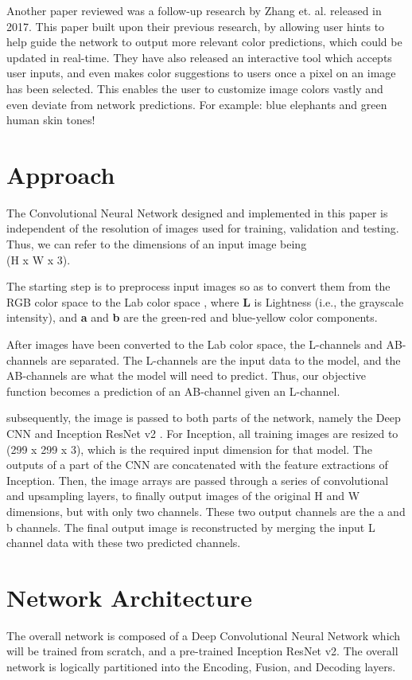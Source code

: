 \documentclass[10pt,twocolumn,letterpaper]{article}
\begin{document}
Another paper reviewed was a follow-up research by Zhang et. al. \cite{Zhang2} released in 2017. This paper built upon their previous research, by allowing user hints to help guide the network to output more relevant color predictions, which could be updated in real-time. They have also released an interactive tool which accepts user inputs, and even makes color suggestions to users once a pixel on an image has been selected. This enables the user to customize image colors vastly and even deviate from network predictions. For example: blue elephants and green human skin tones!

\section{Approach}
The Convolutional Neural Network designed and implemented in this paper is independent of the resolution of images used for training, validation and testing. Thus, we can refer to the dimensions of an input image being\\
(H x W x 3).

The starting step is to preprocess input images so as to convert them from the RGB color space to the Lab color space \cite{LabColorSpace}, where \textbf{L} is Lightness (i.e., the grayscale intensity), and \textbf{a} and \textbf{b} are the green-red and blue-yellow color components.

After images have been converted to the Lab color space, the L-channels and AB-channels are separated. The L-channels are the input data to the model, and the AB-channels are what the model will need to predict. Thus, our objective function becomes a prediction of an AB-channel given an L-channel.

subsequently, the image is passed to both parts of the network, namely the Deep CNN and Inception ResNet v2 \cite{Inception}. For Inception, all training images are resized to\\(299 x 299 x 3), which is the required input dimension for that model. The outputs of a part of the CNN are concatenated with the feature extractions of Inception. Then, the image arrays are passed through a series of convolutional and upsampling layers, to finally output images of the original H and W dimensions, but with only two channels. These two output channels are the a and b channels. The final output image is reconstructed by merging the input L channel data with these two predicted channels.

\section{Network Architecture}
The overall  network is composed of a Deep Convolutional Neural Network which will be trained from scratch, and a pre-trained Inception ResNet v2. The overall network is logically partitioned into the Encoding, Fusion, and Decoding layers.
\end{document}
